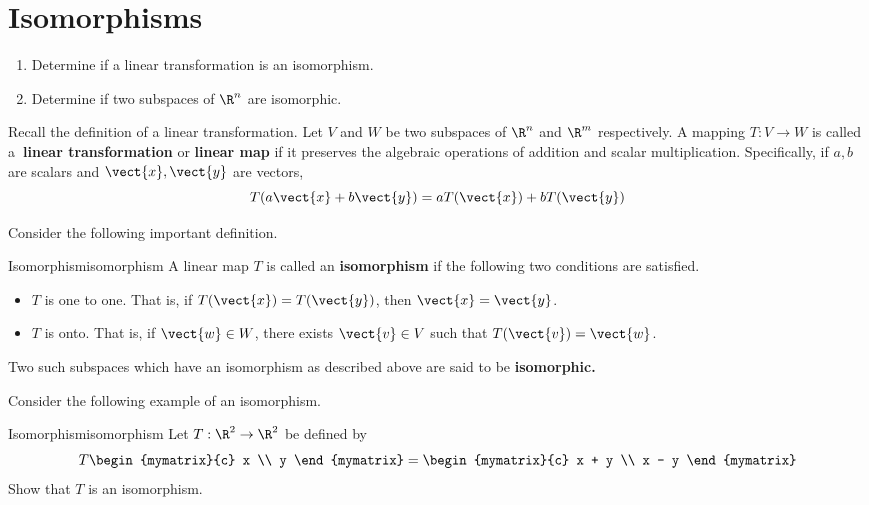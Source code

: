 \section{Isomorphisms}

\begin{outcome}
  \begin{enumerate}
  \item Determine if a linear transformation is an isomorphism.
  \item Determine if two subspaces of $\R^n$ are isomorphic.
  \end{enumerate}
\end{outcome}

Recall the definition of a linear transformation. Let $V$ and $W$ be two subspaces of $\R^{n}$ and $\R^{m}$
respectively. A mapping $T:V\rightarrow W$ is called a\textbf{\ linear
transformation} or \textbf{linear map} if it preserves the algebraic
operations of addition and
 scalar multiplication. Specifically, if $a,b$
are scalars and $
\vect{x},\vect{y}$ are vectors,
\begin{equation*}
T(a\vect{x}+b\vect{y}) =aT(\vect{x})+bT(\vect{y})
\end{equation*}

Consider the following important definition.

\begin{definition}{Isomorphism}{isomorphism}
A linear map $T$ is called an \textbf{isomorphism}
if the following two conditions are satisfied.

\begin{itemize}
\item $T$ is one to one. That is, if $T(\vect{x})=T(\vect{y})$, then $\vect{x}=\vect{y}$.

\item $T$ is onto. That is, if $\vect{w}\in W$, there exists $
\vect{v}\in V$ such that $T(\vect{v})=\vect{w}$.
\end{itemize}

Two such subspaces which have an isomorphism as described above are said to
be \textbf{isomorphic.}
\end{definition}

Consider the following example of an isomorphism.

\begin{example}{Isomorphism}{isomorphism}
Let $T: \R^2 \to \R^2$ be defined by
\[
T \begin{mymatrix}{c}
x \\
y
\end{mymatrix} = \begin{mymatrix}{c}
x + y \\
x - y
\end{mymatrix}
\]
Show that $T$ is an isomorphism.
\end{example}

